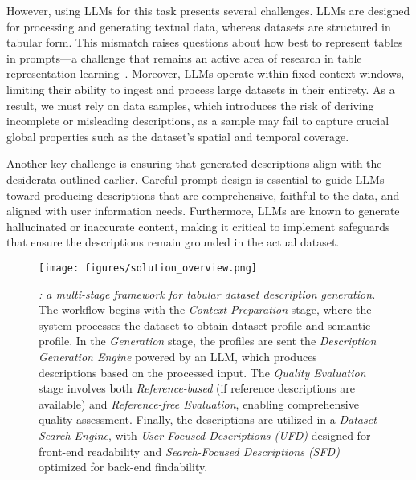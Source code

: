 However, using LLMs for this task presents several challenges. LLMs are designed for processing and generating textual data, whereas datasets are structured in tabular form. This mismatch raises questions about how best to represent tables in prompts—a challenge that remains an active area of research in table representation learning~\cite{sui2024table}. Moreover, LLMs operate within fixed context windows, limiting their ability to ingest and process large datasets in their entirety. As a result, we must rely on data samples, which introduces the risk of deriving incomplete or misleading descriptions, as a sample may fail to capture crucial global properties such as the dataset’s spatial and temporal coverage.

Another key challenge is ensuring that generated descriptions align with the desiderata outlined earlier. Careful prompt design is essential to guide LLMs toward producing descriptions that are comprehensive, faithful to the data, and aligned with user information needs. Furthermore, LLMs are known to generate hallucinated or inaccurate content, making it critical to implement safeguards that ensure the descriptions remain grounded in the actual dataset. 


\begin{figure*}
  \centering
  \texttt{[image: figures/solution\_overview.png]}
  \vspace{-0.3cm}
  \caption{
  \textit{\SystemName: a multi-stage framework for tabular dataset description generation.}
    The workflow begins with the \textit{Context Preparation} stage, where the system processes the dataset to obtain dataset profile and semantic profile.
    In the \textit{Generation} stage, the profiles are sent the \textit{Description Generation Engine} powered by an LLM, which produces descriptions based on the processed input.
    The \textit{Quality Evaluation} stage involves both \textit{Reference-based} (if reference descriptions are available) and \textit{Reference-free Evaluation}, enabling comprehensive quality assessment.
    Finally, the descriptions are utilized in a \textit{Dataset Search Engine}, with \textit{User-Focused Descriptions (UFD)} designed for front-end readability and \textit{Search-Focused Descriptions (SFD)} optimized for back-end findability.  
  }
  \label{fig:solution_overview}
  \vspace{-0.3cm}
\end{figure*}

